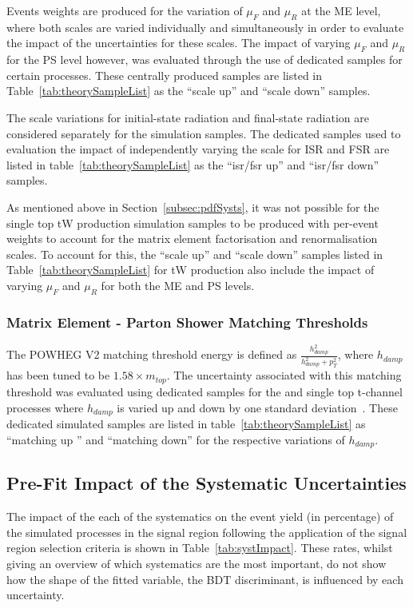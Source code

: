 Events weights are produced for the variation of $\mu_{F}$ and $\mu_{R}$ at the ME level, where both scales are varied individually and simultaneously in order to evaluate the impact of the uncertainties for these scales.
The impact of varying $\mu_{F}$ and $\mu_{R}$ for the PS level however, was evaluated through the use of dedicated samples for certain processes.
These centrally produced samples are listed in Table~\ref{tab:theorySampleList} as the ``scale up'' and ``scale down'' samples. 

The scale variations for initial-state radiation and final-state radiation are considered separately for the \ttbar simulation samples.
The dedicated \ttbar samples used to evaluation the impact of independently varying the scale for ISR and FSR are listed in table~\ref{tab:theorySampleList} as the ``isr/fsr up'' and ``isr/fsr down'' samples.

As mentioned above in Section~\ref{subsec:pdfSysts}, it was not possible for the single top tW production simulation samples to be produced with per-event weights to account for the matrix element factorisation and renormalisation scales.
To account for this, the ``scale up'' and ``scale down'' samples listed in Table~\ref{tab:theorySampleList} for tW production also include the impact of varying $\mu_{F}$ and $\mu_{R}$ for both the ME and PS levels.

\subsubsection{Matrix Element - Parton Shower Matching Thresholds}
The POWHEG V2 matching threshold energy is defined as $\frac{h_{damp}^{2}}{h_{damp}^{2}+p_{T}^{2}}$, where $h_{damp}$ has been tuned to be $1.58 \times m_{top}$.
The uncertainty associated with this matching threshold was evaluated using dedicated samples for the \ttbar and single top t-channel processes where $h_{damp}$ is varied up and down by one standard deviation~\cite{CMS:2016kle}.
These dedicated simulated samples are listed in table~\ref{tab:theorySampleList} as ``matching up '' and ``matching down'' for the respective variations of $h_{damp}$.

\subsection{Pre-Fit Impact of the Systematic Uncertainties}\label{sec:uncertainitiesPreFitImpact}
The impact of the each of the systematics on the event yield (in percentage) of the simulated processes in the signal region following the application of the signal region selection criteria is shown in Table~\ref{tab:systImpact}.
These rates, whilst giving an overview of which systematics are the most important, do not show how the shape of the fitted variable, the BDT discriminant, is influenced by each uncertainty.

